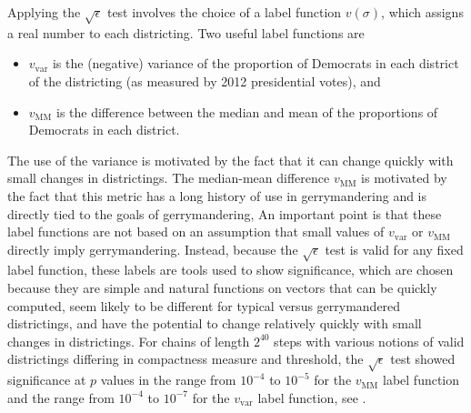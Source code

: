 \documentclass[12pt]{article}
\begin{document}
Applying the \( \sqrt{\epsilon} \) test involves the choice of a label
function \( v(\sigma) \), which assigns a real number to each
districting.  Two useful label functions are
\begin{itemize}
    \item
        \( v_{\text{var}} \) is the (negative) variance of the
        proportion of Democrats in each district of the districting (as
        measured by 2012 presidential votes), and
    \item
        \( v_{\text{MM}} \) is the difference between the median and
        mean of the proportions of Democrats in each district.
\end{itemize}
The use of the variance is motivated by the fact that it can change
quickly with small changes in districtings.  The median-mean difference \(
v_{\text{MM}} \) is motivated by the fact that this metric has a long
history of use in gerrymandering and is directly tied to the goals of
gerrymandering, An important point is that these label functions are not
based on an assumption that small values of \( v_{\text {var}} \) or \(
v_{\text{MM}} \) directly imply gerrymandering.  Instead, because the \(
\sqrt{\epsilon} \) test is valid for any fixed label function, these
labels are tools used to show significance, which are chosen because
they are simple and natural functions on vectors that can be quickly
computed, seem likely to be different for typical versus gerrymandered
districtings, and have the potential to change relatively quickly with
small changes in districtings.  For chains of length \( 2^{40} \) steps
with various notions of valid districtings differing in compactness
measure and threshold, the \( \sqrt{\epsilon} \) test showed
significance at \( p \) values in the range from \( 10^{-4} \) to \( 10^
{-5} \) for the \( v_{\text {MM}} \) label function and the range from \(
10^{-4} \) to \( 10^{-7} \) for the \( v_{\text{var}} \) label function,
see
\cite{chikina2860si}.
\end{document}
